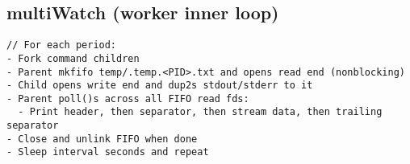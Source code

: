 \documentclass[11pt,a4paper]{article}
\begin{document}
\subsection{multiWatch (worker inner loop)}
\begin{lstlisting}[style=code]
// For each period:
- Fork command children
- Parent mkfifo temp/.temp.<PID>.txt and opens read end (nonblocking)
- Child opens write end and dup2s stdout/stderr to it
- Parent poll()s across all FIFO read fds:
  - Print header, then separator, then stream data, then trailing separator
- Close and unlink FIFO when done
- Sleep interval seconds and repeat
\end{lstlisting}
\end{document}
